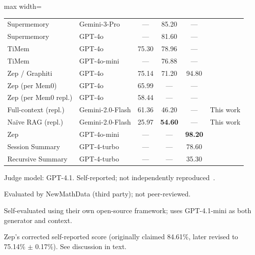 \begin{table}[!t]
\begin{adjustbox}{max width=\textwidth}
\begin{threeparttable}
\begin{tabular}{@{}llcccl@{}}
Supermemory          & Gemini-3-Pro      & ---                  & 85.20           & ---   & \cite{supermemory2025} \\
Supermemory          & GPT-4o            & ---                  & 81.60           & ---   & \cite{supermemory2025} \\
TiMem                & GPT-4o            & 75.30                & 78.96           & ---   & \cite{timem2026} \\
TiMem                & GPT-4o-mini       & ---                  & 76.88           & ---   & \cite{timem2026} \\
Zep / Graphiti       & GPT-4o            & 75.14\tnote{d}       & 71.20           & 94.80 & \cite{zep2025,dempsey2025graphiti} \\
Zep (per Mem0)       & GPT-4o            & 65.99\tnote{g}       & ---             & ---   & \cite{choudhary2025mem0} \\
Zep (per Mem0 repl.) & GPT-4o            & 58.44\tnote{g}       & ---             & ---   & \cite{mem0replication2025} \\
\midrule
Full-context (repl.) & Gemini-2.0-Flash\tnote{h} & 61.36             & 46.20              & ---   & This work \\
Na\"ive RAG (repl.)  & Gemini-2.0-Flash\tnote{h} & 25.97             & \textbf{54.60}     & ---   & This work \\
\midrule
Zep                  & GPT-4o-mini       & ---                  & ---             & \textbf{98.20} & \cite{dempsey2025graphiti} \\
Session Summary      & GPT-4-turbo       & ---                  & ---             & 78.60 & \cite{packer2023memgpt} \\
Recursive Summary    & GPT-4-turbo       & ---                  & ---             & 35.30 & \cite{packer2023memgpt} \\
\bottomrule
\end{tabular}
\begin{tablenotes}[flushleft]\footnotesize
\item[a] Judge model: GPT-4.1.  Self-reported; not independently reproduced~\cite{latimer2025hindsight}.
\item[b] Evaluated by NewMathData (third party); not peer-reviewed.
\item[c] Self-evaluated using their own open-source framework; uses GPT-4.1-mini as both generator and context.
\item[d] Zep's corrected self-reported score (originally claimed 84.61\%, later revised to 75.14\% $\pm$ 0.17\%).  See discussion in text.

\end{tablenotes}
\end{threeparttable}
\end{adjustbox}
\end{table}
